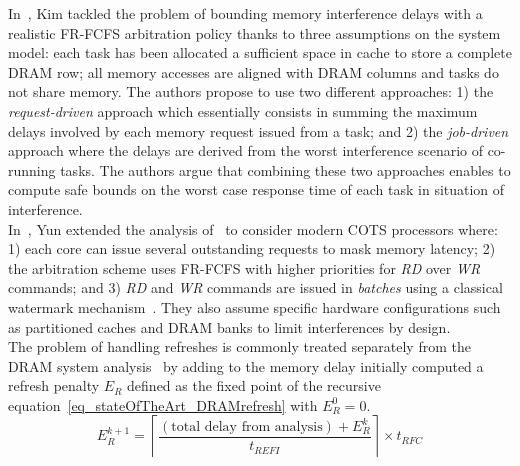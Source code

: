 \documentclass[main.tex]{subfiles}
\begin{document}
In~\cite{kim2014bounding}, Kim \etal tackled the problem of bounding memory
interference delays with a realistic FR-FCFS arbitration policy thanks to three
assumptions on the system model: each task has been allocated a sufficient
space in cache to store a complete DRAM row;  all memory accesses are aligned
with DRAM columns and  tasks do not share memory. The authors propose to use
two different approaches: 1) the \emph{request-driven} approach which
essentially consists in summing the maximum delays involved by each memory
request issued from a task; and 2) the \emph{job-driven} approach where the
delays are derived from the worst interference scenario of co-running tasks.
The authors argue that combining these two approaches enables to compute safe
bounds on the worst case response time of each task in situation of
interference. \\

In~\cite{Yun2015}, Yun \etal extended the analysis of~\cite{kim2014bounding} to
consider modern COTS processors where: 1) each core can issue several
outstanding requests to mask memory latency; 2) the arbitration scheme uses
FR-FCFS with higher priorities for \emph{RD} over \emph{WR} commands; and 3)
\emph{RD} and \emph{WR} commands are issued in \emph{batches} using a classical
watermark mechanism~\cite{Chatterjee2012}. They also assume specific hardware
configurations such as partitioned caches and DRAM banks to limit interferences
by design. \\

The problem of handling refreshes is commonly treated separately from the DRAM
system analysis~\cite{Atanassov2001, Bhat2010, kim2014bounding} by adding to
the memory delay initially computed a refresh penalty $E_R$ defined as the
fixed point of the recursive equation~\ref{eq_stateOfTheArt_DRAMrefresh} with
$E_R^0 = 0$.
\begin{equation}
    \label{eq_stateOfTheArt_DRAMrefresh}
    E_{R}^{k+1} = \left\lceil \frac{ (\text{total delay from analysis}) + E_R^k }{ t_{REFI} } \right\rceil \times t_{RFC}
\end{equation}
\end{document}
